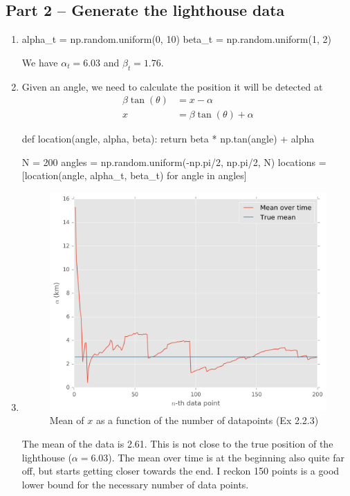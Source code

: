 \documentclass{article}
\begin{document}
\subsection*{Part 2 -- Generate the lighthouse data}
\begin{enumerate}
\item 
\begin{python}
alpha_t = np.random.uniform(0, 10)
beta_t = np.random.uniform(1, 2)
\end{python}
We have $\alpha_t = 6.03$ and $\beta_t=1.76$.
\item 
Given an angle, we need to calculate the position it will be detected at
\begin{align*}
\beta \tan(\theta) &= x - \alpha \\
x &=  \beta \tan(\theta) + \alpha
\end{align*}
\begin{python}
def location(angle, alpha, beta):
    return beta * np.tan(angle) + alpha

N = 200
angles = np.random.uniform(-np.pi/2, np.pi/2, N)
locations = [location(angle, alpha_t, beta_t) for angle in angles]
\end{python}
\item 
\begin{figure}[H]
\centering
\includegraphics[width=.6\textwidth]{images/mean_x.png}
\caption{Mean of $x$ as a function of the number of datapoints (Ex 2.2.3)}
\end{figure}
The mean of the data is 2.61. This is not close to the true position of the lighthouse ($\alpha = 6.03$). The mean over time is at the beginning also quite far off, but starts getting closer towards the end. I reckon 150 points is a good lower bound for the necessary number of data points.
\end{enumerate}
\end{document}
